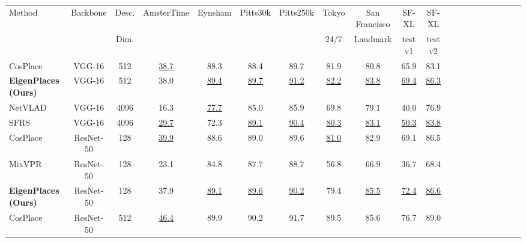 \documentclass[10pt,twocolumn,letterpaper]{article}
\begin{document}
\begin{table*}
\begin{center}
\begin{adjustbox}{width=0.9\linewidth}
\centering
\begin{tabular}{lccccccccccccccccccc}
\toprule
\multirow{2}{*}{Method} & \multirow{2}{*}{Backbone} & Desc. & \multirow{2}{*}{AmsterTime} & \multirow{2}{*}{Eynsham} & \multirow{2}{*}{Pitts30k} &
\multirow{2}{*}{Pitts250k} & Tokyo & San Francisco & SF-XL & SF-XL \\
& & Dim. & & & & & 24/7 & Landmark & test v1 & test v2 \\
\hline


CosPlace \cite{Berton_2022_cosPlace}     & VGG-16    &  512 &\underline{38.7}&           88.3 &           88.4 &           89.7 &           81.9 &           80.8 &           65.9 &           83.1 \\
\textbf{EigenPlaces (Ours)}              & VGG-16    &  512 &           38.0 &\underline{89.4}&\underline{89.7}&\underline{91.2}&\underline{82.2}&\underline{83.8}&\underline{69.4}&\underline{86.3}\\
\hline
NetVLAD \cite{Arandjelovic_2018_netvlad} & VGG-16    & 4096 &           16.3 &\underline{77.7}&           85.0 &           85.9 &           69.8 &           79.1 &           40.0 &           76.9 \\
SFRS \cite{Ge_2020_sfrs}                 & VGG-16    & 4096 &\underline{29.7}&           72.3 &\underline{89.1}&\underline{90.4}&\underline{80.3}&\underline{83.1}&\underline{50.3}&\underline{83.8}\\
\hline
CosPlace \cite{Berton_2022_cosPlace}     & ResNet-50 &  128 &\underline{39.9}&           88.6 &           89.0 &           89.6 &\underline{81.0}&           82.9 &           69.1 &           86.5 \\
MixVPR \cite{Alibey_2023_mixvpr}         & ResNet-50 &  128 &           23.1 &           84.8 &           87.7 &           88.7 &           56.8 &           66.9 &           36.7 &           68.4 \\
\textbf{EigenPlaces (Ours)}              & ResNet-50 &  128 &           37.9 &\underline{89.1}&\underline{89.6}&\underline{90.2}&           79.4 &\underline{85.5}&\underline{72.4}&\underline{86.6}\\
\hline
CosPlace \cite{Berton_2022_cosPlace}     & ResNet-50 &  512 &\underline{46.4}&           89.9 &           90.2 &           91.7 &           89.5 &           85.6 &           76.7 &           89.0 \\

\end{tabular}
\end{adjustbox}
\end{center}
\end{table*}
\end{document}
